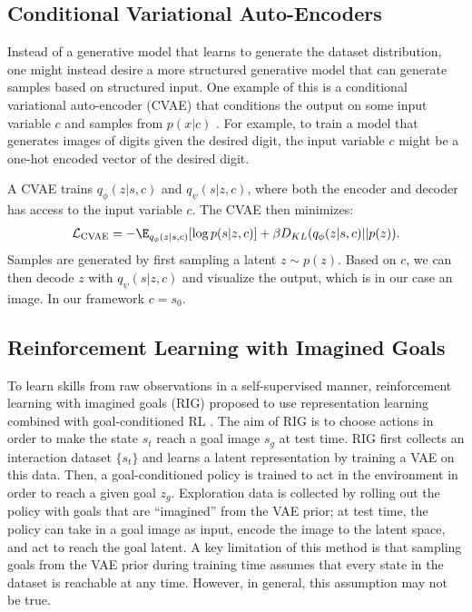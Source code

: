 \subsection{Conditional Variational Auto-Encoders}
\label{sec:cvae}

Instead of a generative model that learns to generate the dataset distribution, one might instead desire a more structured generative model that can generate samples based on structured input.
One example of this is a conditional variational auto-encoder (CVAE) that conditions the output on some input variable $c$ and samples from $p(x|c)$ \cite{sohn2015cvae}.
For example, to train a model that generates images of digits given the desired digit, the input variable $c$ might be a one-hot encoded vector of the desired digit.

A CVAE trains $q_\phi(z|s, c)$ and $q_\psi(s|z, c)$, where both the encoder and decoder has access to the input variable $c$. The CVAE then minimizes:
\begin{align} \label{eq:isc-vae-loss}
    \mathcal L_\text{CVAE} = -\E_{q_\phi(z|s, c)} [\log p(s|z, c)] + \beta D_{KL}(q_\phi(z|s, c)||p(z)).
\end{align}
Samples are generated by first sampling a latent $z \sim p(z)$. Based on $c$, we can then decode $z$ with $q_\psi(s|z, c)$ and visualize the output, which is in our case an image.
In our framework $c = s_{0}$.

\subsection{Reinforcement Learning with Imagined Goals}
\label{sec:rig}

To learn skills from raw observations in a self-supervised manner, reinforcement learning with imagined goals (RIG) proposed to use representation learning combined with goal-conditioned RL \cite{nair2018rig}.
The aim of RIG is to choose actions in order to make the state $s_t$ reach a goal image $s_g$ at test time.
RIG first collects an interaction dataset $\{s_t\}$ and learns a latent representation by training a VAE on this data.
Then, a goal-conditioned policy is trained to act in the environment in order to reach a given goal $z_g$.
Exploration data is collected by rolling out the policy with goals that are ``imagined'' from the VAE prior; at test time, the policy can take in a goal image as input, encode the image to the latent space, and act to reach the goal latent.
A key limitation of this method is that sampling goals from the VAE prior during training time assumes that every state in the dataset is reachable at any time.
However, in general, this assumption may not be true.

